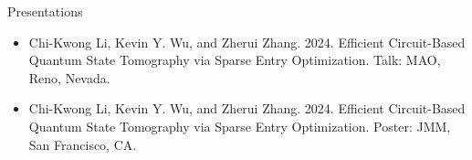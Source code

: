\begin{rSection}{Presentations}

\begin{itemize}
    \item Chi-Kwong Li, Kevin Y. Wu, and Zherui Zhang. 2024. Efficient Circuit-Based Quantum State Tomography via Sparse Entry Optimization. Talk: MAO, Reno, Nevada.
    \item Chi-Kwong Li, Kevin Y. Wu, and Zherui Zhang. 2024. Efficient Circuit-Based Quantum State Tomography via Sparse Entry Optimization. Poster: JMM, San Francisco, CA.
\end{itemize}
\end{rSection}